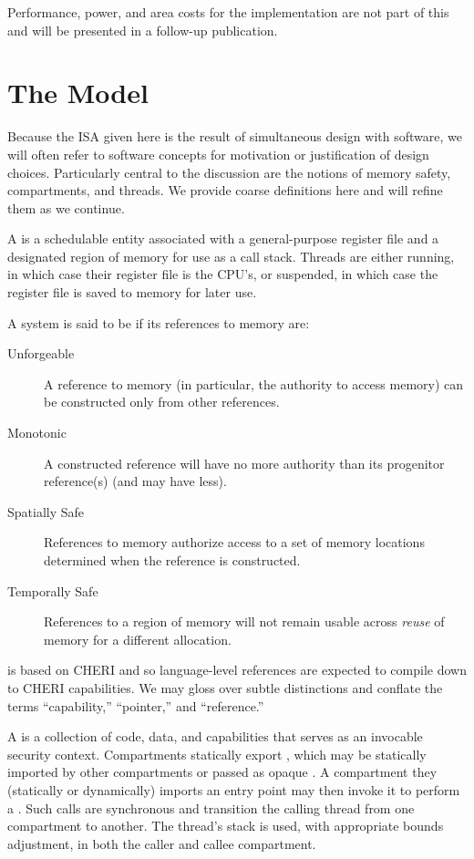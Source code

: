 Performance, power, and area costs for the implementation are not part of this and will be presented in a follow-up publication.

\section{The \cherimcuos{} Model}

Because the ISA given here is the result of simultaneous design with software, we will often refer to software concepts for motivation or justification of design choices.
Particularly central to the discussion are the notions of memory safety, compartments, and threads.
We provide coarse definitions here and will refine them as we continue.

A  is a schedulable entity associated with a general-purpose register file and a designated region of memory for use as a call stack.
Threads are either running, in which case their register file is the CPU's, or suspended, in which case the register file is saved to memory for later use.

A system is said to be  if its references to memory are:
%
\begin{description}

  \item[Unforgeable] A reference to memory (in particular, the authority to access memory) can be constructed only from other references.

  \item[Monotonic] A constructed reference will have no more authority than its progenitor reference(s) (and may have less).

  \item[Spatially Safe] References to memory authorize access to a set of memory locations determined when the reference is constructed.

  \item[Temporally Safe] References to a region of memory will not remain usable across \emph{reuse} of memory for a different allocation.

\end{description}
%
\cherimcu{} is based on CHERI and so language-level references are expected to compile down to CHERI capabilities.
We may gloss over subtle distinctions and conflate the terms ``capability,'' ``pointer,'' and ``reference.''

A  is a collection of code, data, and capabilities that serves as an invocable security context.
Compartments statically export , which may be statically imported by other compartments or passed as opaque .
A compartment they (statically or dynamically) imports an entry point may then invoke it to perform a .
Such calls are synchronous and transition the calling thread from one compartment to another.
The thread's stack is used, with appropriate bounds adjustment, in both the caller and callee compartment.

